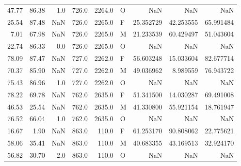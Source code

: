 \begin{table}
\begin{tabular}{rrrrrlrrr}
47.77 &  86.38 &      1.0 &  726.0 & 2264.0 &      O &       NaN &       NaN &       NaN \\
25.54 &  87.48 &      NaN &  726.0 & 2265.0 &      F & 25.352729 & 42.253555 & 65.991484 \\
 7.01 &  67.98 &      NaN &  726.0 & 2265.0 &      M & 21.233539 & 60.429497 & 51.043604 \\
22.74 &  86.33 &      0.0 &  726.0 & 2265.0 &      O &       NaN &       NaN &       NaN \\
78.09 &  87.47 &      NaN &  727.0 & 2262.0 &      F & 56.603248 & 15.033604 & 82.677714 \\
70.37 &  85.90 &      NaN &  727.0 & 2262.0 &      M & 49.036962 &  8.989559 & 76.943722 \\
75.43 &  86.96 &      1.0 &  727.0 & 2262.0 &      O &       NaN &       NaN &       NaN \\
78.22 &  69.78 &      NaN &  762.0 & 2635.0 &      F & 51.341500 & 14.030287 & 69.491008 \\
46.53 &  25.54 &      NaN &  762.0 & 2635.0 &      M & 41.330800 & 55.921154 & 18.761947 \\
76.52 &  66.04 &      1.0 &  762.0 & 2635.0 &      O &       NaN &       NaN &       NaN \\
16.67 &   1.90 &      NaN &  863.0 &  110.0 &      F & 61.253170 & 90.808062 & 22.775621 \\
58.06 &  35.41 &      NaN &  863.0 &  110.0 &      M & 40.683355 & 43.169513 & 32.924170 \\
56.82 &  30.70 &      2.0 &  863.0 &  110.0 &      O &       NaN &       NaN &       NaN \\
\bottomrule
\end{tabular}
\end{table}
